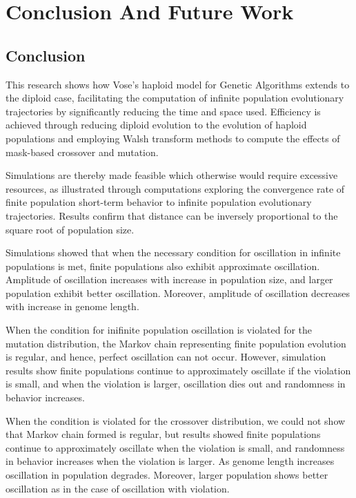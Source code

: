 \chapter{Conclusion And Future Work}
\section{Conclusion}
This research shows how Vose's haploid model for Genetic Algorithms
extends to the diploid case, facilitating the computation of infinite
population evolutionary trajectories by significantly reducing the
time and space used.  Efficiency is achieved through reducing diploid evolution 
to the evolution of haploid populations
and employing Walsh transform methods to compute the effects of
mask-based crossover and mutation.  

Simulations are thereby made feasible which otherwise would require
excessive resources, as illustrated through computations exploring 
the convergence rate of finite population short-term behavior to infinite population evolutionary trajectories. 
Results confirm that distance can be inversely proportional to the square root of population size.

Simulations showed that when the necessary condition for oscillation in infinite populations is met, 
finite populations also exhibit approximate oscillation. Amplitude of oscillation increases with 
increase in population size, and larger population exhibit better oscillation. Moreover, amplitude of 
oscillation decreases with increase in genome length.

When the condition for inifinite population oscillation is violated for the mutation distribution, 
the Markov chain representing finite population evolution is regular, and hence, 
perfect oscillation can not occur. However, simulation results show 
finite populations continue to approximately oscillate if the violation is small, 
and when the violation is larger, oscillation dies out and randomness in behavior increases. 

When the condition is violated for the crossover distribution,
we could not show that Markov chain formed is regular, 
but results showed finite populations continue to approximately oscillate 
when the violation is small, and randomness in behavior increases when the violation is larger. 
As genome length increases oscillation in population degrades. 
Moreover, larger population shows better oscillation 
as in the case of oscillation with violation.


